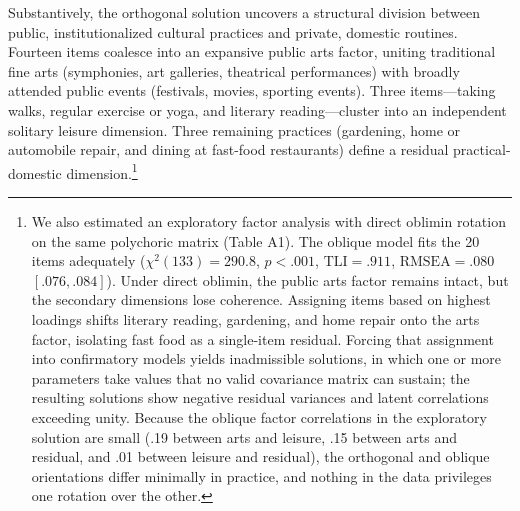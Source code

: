 \documentclass[
  12pt
]{article}
\begin{document}
Substantively, the orthogonal solution uncovers a structural division between public, institutionalized cultural practices and private, domestic routines. Fourteen items coalesce into an expansive public arts factor, uniting traditional fine arts (symphonies, art galleries, theatrical performances) with broadly attended public events (festivals, movies, sporting events). Three items---taking walks, regular exercise or yoga, and literary reading---cluster into an independent solitary leisure dimension. Three remaining practices (gardening, home or automobile repair, and dining at fast-food restaurants) define a residual practical-domestic dimension.\footnote{We also estimated an exploratory factor analysis with direct oblimin rotation on the same polychoric matrix (Table A1). The oblique model fits the 20 items adequately ($\chi^2(133) = 290.8$, $p < .001$, $\text{TLI} = .911$, $\text{RMSEA} = .080$ $[.076, .084]$). Under direct oblimin, the public arts factor remains intact, but the secondary dimensions lose coherence. Assigning items based on highest loadings shifts literary reading, gardening, and home repair onto the arts factor, isolating fast food as a single-item residual. Forcing that assignment into confirmatory models yields inadmissible solutions, in which one or more parameters take values that no valid covariance matrix can sustain; the resulting solutions show negative residual variances and latent correlations exceeding unity. Because the oblique factor correlations in the exploratory solution are small (.19 between arts and leisure, .15 between arts and residual, and .01 between leisure and residual), the orthogonal and oblique orientations differ minimally in practice, and nothing in the data privileges one rotation over the other.}
\end{document}
